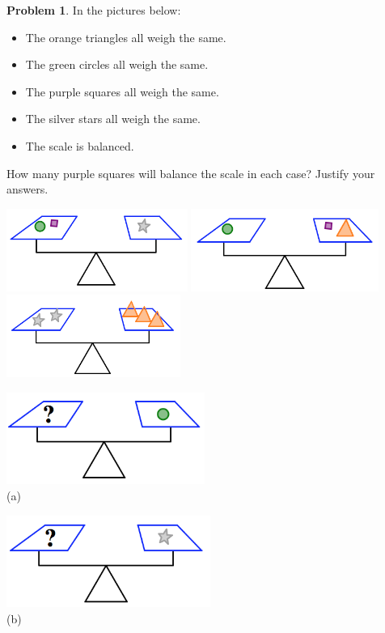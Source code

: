 \documentclass[12pt, reqno]{amsart}
\theoremstyle{remark}
\theoremstyle{definition}
\newtheorem{problem}{Problem}
\numberwithin{equation}{section}  %
\begin{document}
\begin{problem}\label{prob: balance2}
In the pictures below:
\begin{itemize}
\item
The orange triangles all weigh the same.  
\item
The green circles all weigh the same.  
\item
The purple squares all weigh the same.  
\item
The silver stars all weigh the same.
\item
The scale is balanced.
\end{itemize}
How many purple squares will balance the scale in each case?  Justify your answers.
\begin{center}
\includegraphics[height=2.7cm]{balance2a}\quad
\includegraphics[height=2.7cm]{balance2b}
\includegraphics[height=2.7cm]{balance2c}

\bigskip
\bigskip

\includegraphics[height=3cm]{balance2d1}\\
(a)

\bigskip

\includegraphics[height=3cm]{balance2d2}\\
(b)
\bigskip



\end{center}
\end{problem}
\end{document}

